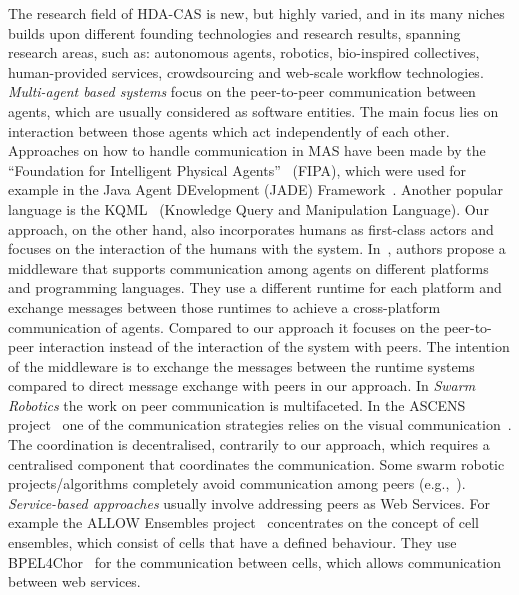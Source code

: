   The research field of HDA-CAS is new, but highly varied, and in its many niches builds upon different founding technologies and research results, spanning research areas, such as: autonomous agents, robotics, bio-inspired collectives, human-provided services, crowdsourcing and web-scale workflow technologies. 
  \emph{Multi-agent based systems} focus on the peer-to-peer communication between agents, which are usually considered as software entities. The main focus lies on interaction between those agents which act independently of each other. Approaches on how to handle communication in MAS have been made by the ``Foundation for Intelligent Physical Agents''~\cite{FIPA} (FIPA), which were used for example in the Java Agent DEvelopment (JADE) Framework~\cite{JADE}. Another popular language is the KQML~\cite{KQML} (Knowledge Query and Manipulation Language). 
  Our approach, on the other hand, also incorporates humans as first-class actors and focuses on the interaction of the humans with the system. 
  In~\cite{Cabri1}, authors propose a middleware that supports communication among agents on different platforms and programming languages. They use a different runtime for each platform and exchange messages between those runtimes to achieve a cross-platform communication of agents. Compared to our approach it focuses on the peer-to-peer interaction instead of the interaction of the system with peers. The intention of the middleware is to exchange the messages between the runtime systems compared to direct message exchange with peers in our approach.
  In \emph{Swarm Robotics} the work on peer communication is multifaceted. In the ASCENS project~\cite{Zambonelli} one of the communication strategies relies on the visual communication~\cite{VisualComm}. The coordination is decentralised, contrarily to our approach, which requires a centralised component that coordinates the communication. Some swarm robotic projects/algorithms completely avoid communication among peers (e.g.,~\cite{BEECLUST}).
  \emph{Service-based approaches} usually involve addressing peers as Web Services. For example the ALLOW Ensembles project~\cite{Andrikopoulos} concentrates on the concept of cell ensembles, which consist of cells that have a defined behaviour. They use BPEL4Chor~\cite{BPEL4Chor} for the communication between cells, which allows communication between web services. 
